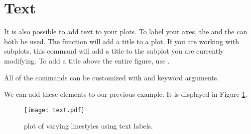 \section*{Text} %

It is also possible to add text to your plots.
To label your axes, the  and the  can both be used.
The function  will add a title to a plot.
If you are working with subplots, this command will add a title to the subplot you are currently modifying.
To add a title above the entire figure, use .

All of the  commands can be customized with  and  keyword arguments.

We can add these elements to our previous example.
It is displayed in Figure \ref{text}.



\begin{figure}
\texttt{[image: text.pdf]}
\caption{plot of varying linestyles using text labels.}
\label{text}
\end{figure}

